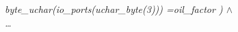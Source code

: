 \documentclass[11pt]{article} %
\begin{document}
{\begin{sloppypar}
\hspace*{1.10in}\it byte\_uchar\rm (\it io\_ports\rm (\it uchar\_byte\rm (\rm 3\rm )\rm )\rm ) \rm
=\hspace*{0.10in}\it oil\_factor \rm ) $\land$\\
\hspace*{1.10in}\ldots\\ 

\end{sloppypar}}
\end{document}
